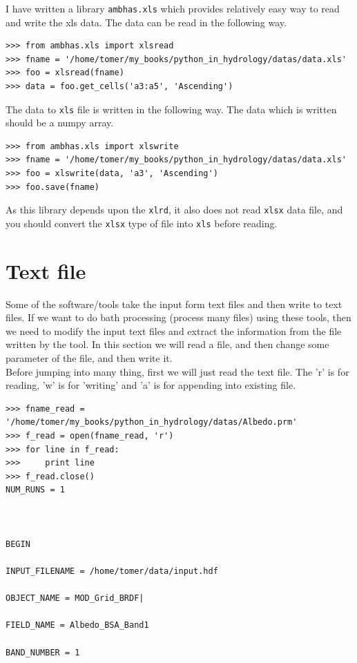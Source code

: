 \documentclass[10pt]{book}
\begin{document}
{I have written a library \verb"ambhas.xls" which provides relatively easy way to read and write the xls data. The data can be read in the following way. 
\beforeverb \begin{verbatim}
>>> from ambhas.xls import xlsread
>>> fname = '/home/tomer/my_books/python_in_hydrology/datas/data.xls'
>>> foo = xlsread(fname)
>>> data = foo.get_cells('a3:a5', 'Ascending')
\end{verbatim} \afterverb

The data to \verb"xls" file is written in the following way. The data which is written should be a numpy array.
\beforeverb \begin{verbatim}
>>> from ambhas.xls import xlswrite
>>> fname = '/home/tomer/my_books/python_in_hydrology/datas/data.xls'
>>> foo = xlswrite(data, 'a3', 'Ascending')
>>> foo.save(fname)
\end{verbatim} \afterverb
As this library depends upon the \verb"xlrd", it also does not read \verb"xlsx" data file, and you should convert the \verb"xlsx" type of file into \verb"xls" before reading.

\section{Text file}
Some of the software/tools take the input form text files and then write to text files. If we want to do bath processing (process many files) using these tools, then we need to modify the input text files and extract the information from the file written by the tool. In this section we will read a file, and then change some parameter of the file, and then write it.\\

Before jumping into many thing, first we will just read the text file. The 'r' is for reading, 'w' is for 'writing' and 'a' is for appending into existing file. 
\beforeverb \begin{verbatim}
>>> fname_read = '/home/tomer/my_books/python_in_hydrology/datas/Albedo.prm'
>>> f_read = open(fname_read, 'r')
>>> for line in f_read:
>>>     print line
>>> f_read.close()
NUM_RUNS = 1



BEGIN

INPUT_FILENAME = /home/tomer/data/input.hdf

OBJECT_NAME = MOD_Grid_BRDF|

FIELD_NAME = Albedo_BSA_Band1

BAND_NUMBER = 1


\end{verbatim}}
\end{document}
